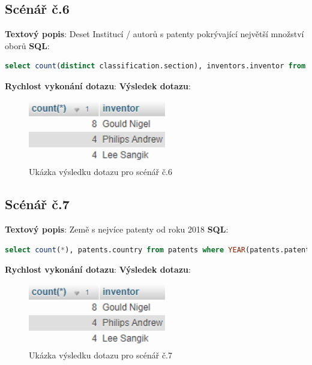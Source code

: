 \subsection{Scénář č.6}
\textbf{Textový popis}: Deset Institucí / autorů s patenty pokrývající největší množství oborů
\newline
\textbf{SQL}: 
\begin{lstlisting}[language=SQL, breaklines=true, frame=single, label = {lst:elements_a}, captionpos=b]
select count(distinct classification.section), inventors.inventor from inventors left outer join classification on classification.id_patent = inventors.id_patent where section is not null group by inventors.inventor order by count(distinct classification.section) desc LIMIT 10;
\end{lstlisting}
\textbf{Rychlost vykonání dotazu}: 
\newline
\textbf{Výsledek dotazu}:
\begin{figure}[h!]
\centering
\includegraphics[width=6cm]{img/scenare/scenar_9}
\caption{Ukázka výsledku dotazu pro scénář č.6}
\label{fig:scenar6}
\end{figure}

\subsection{Scénář č.7}
\textbf{Textový popis}: Země s nejvíce patenty od roku 2018
\newline
\textbf{SQL}: 
\begin{lstlisting}[language=SQL, breaklines=true, frame=single, label = {lst:elements_a}, captionpos=b]
select count(*), patents.country from patents where YEAR(patents.patent_date) >= 2018 group by patents.country order by count(*) desc;
\end{lstlisting}
\textbf{Rychlost vykonání dotazu}: 
\newline
\textbf{Výsledek dotazu}:
\begin{figure}[h!]
\centering
\includegraphics[width=6cm]{img/scenare/scenar_9}
\caption{Ukázka výsledku dotazu pro scénář č.7}
\label{fig:scenar7}
\end{figure}

